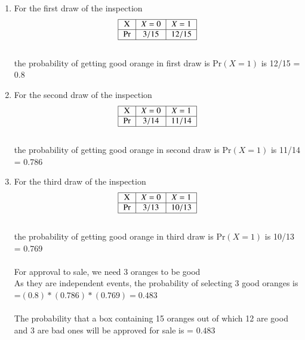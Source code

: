 \documentclass[journal,12pt,twocolumn]{IEEEtran}
\begin{document}
\begin{enumerate}
    
\item For the first draw of the inspection
\begin{align}
  \begin{tabular}{| c| c| c| }
  \hline
 X & $X=0$ & $X=1$\\ 
 \hline
Pr &$3/15$ & $12/15$ \\  
 \hline
\end{tabular}
\end{align}\\
the probability of getting good orange in first draw is Pr$(X=1)$ is 12/15 = 0.8\

\item For the second draw of the inspection
\begin{align}
    \begin{tabular}{| c| c| c| }
  \hline
 X & $X=0$ & $X=1$\\ 
 \hline
Pr &$3/14$ & $11/14$ \\  
 \hline
\end{tabular}
\end{align}\\
the probability of getting good orange in second draw is Pr$(X=1)$ is 11/14 = 0.786 \

\item For the third draw of the inspection
\begin{align}
   \begin{tabular}{| c| c| c| }
  \hline
 X & $X=0$ & $X=1$\\ 
 \hline
Pr &$3/13$ & $10/13$ \\  
 \hline
\end{tabular}  
\end{align}\\
the probability of getting good orange in third draw is Pr$(X=1)$ is 10/13 = 0.769 \\\\
For approval to sale, we need 3 oranges to be good\\
As they are independent events, the probability of selecting 3 good oranges is =$(0.8)*(0.786)*(0.769) =0.483 $\\\\
The probability that a box containing 15 oranges out of which 12 are good and 3 are bad ones will be approved for sale is = $0.483$
\end{enumerate}
\end{document}
